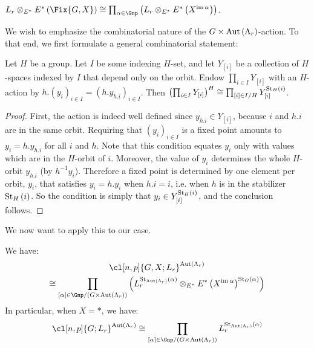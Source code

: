 \begin{proposition}\label{Lr-Fix}
	$
	L_r \otimes_{E^*} E^*\left(\Fix{G,X}\right)
	\cong \prod_{\alpha \in \Gnp} \left(L_r \otimes_{E^*} E^*\left(X^{\im \alpha}\right)\right)
	$.
\end{proposition}

We wish to emphasize the combinatorial nature of the $G \times \operatorname{Aut} \left(\Lambda_r\right)$-action.
To that end, we first formulate a general combinatorial statement:

\begin{proposition}\label{combinatorial-situation}
	Let $H$ be a group.
	Let $I$ be some indexing $H$-set, and let $Y_{\left[i\right]}$ be a collection of $H$-spaces indexed by $I$ that depend only on the orbit.
	Endow $\prod_{i \in I} Y_{\left[i\right]}$ with an $H$-action by
	$
	h.\left(y_i\right)_{i \in I}
	= \left(h.y_{h.i}\right)_{i \in I}
	$.
	Then
	$
	\left(\prod_{i \in I} Y_{\left[i\right]}\right)^H
	\cong \prod_{\left[i\right] \in I/H} Y_{\left[i\right]}^{\operatorname{St}_H\left(i\right)}
	$.
\end{proposition}

\begin{proof}
	First, the action is indeed well defined since $y_{h.i} \in Y_{\left[i\right]}$, because $i$ and $h.i$ are in the same orbit.
	Requiring that $\left(y_i\right)_{i \in I}$ is a fixed point amounts to $y_i = h.y_{h.i}$ for all $i$ and $h$.
	Note that this condition equates $y_i$ only with values which are in the $H$-orbit of $i$.
	Moreover, the value of $y_i$ determines the whole $H$-orbit $y_{h.i}$ (by $h^{-1} y_i$).
	Therefore a fixed point is determined by one element per orbit, $y_i$, that satisfies $y_i = h. y_i$ when $h.i = i$, i.e. when $h$ is in the stabilizer $\operatorname{St}_H\left(i\right)$.
	So the condition is simply that $y_i \in Y_{\left[i\right]}^{\operatorname{St}_H\left(i\right)}$, and the conclusion follows.
\end{proof}

We now want to apply this to our case.

\begin{proposition}\label{combinatorial-cl-fixed}
	We have:
	\begin{multline*}
		\cl[n,p]{G,X; L_r}^{\aut \left(\Lambda_r\right)}\\
		\cong \prod_{\left[\alpha\right] \in \Gnp/{\left(G \times \aut \left(\Lambda_r\right)\right)}}
		\left(
		L_r^{\stab_{\aut \left(\Lambda_r\right)}\left(\alpha\right)}
		\otimes_{E^*} E^*\left(X^{\im \alpha}\right)^{\stab_G\left(\alpha\right)}
		\right)
	\end{multline*}
	In particular, when $X = *$, we have:
	$$
	\cl[n,p]{G; L_r}^{\aut \left(\Lambda_r\right)}
	\cong \prod_{\left[\alpha\right] \in \Gnp/{\left(G \times \aut \left(\Lambda_r\right)\right)}}
	L_r^{\stab_{\aut \left(\Lambda_r\right)}\left(\alpha\right)}
	$$
\end{proposition}

